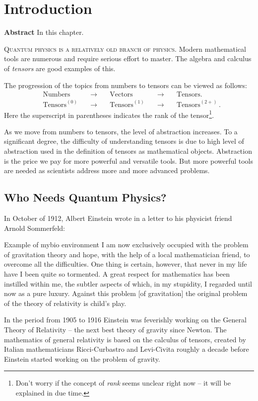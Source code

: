 \graphicspath{{../01Introduction/pics/}}

\chapter{Introduction}\label{ch:Introduction}

{\bf Abstract}\hspace{0.2cm} In this chapter.


\lettrine[lines=2]{\color{darkocre}Q}{uantum physics is a relatively old branch of physics}. Modern mathematical tools are numerous and require
serious effort to master. The algebra and calculus of \emph{tensors}
are good examples of this.

The progression of the topics from
numbers to tensors can be viewed as follows:
\begin{align*}
  & \textrm{Numbers} \quad & \rightarrow \quad & \textrm{Vectors} \quad &
  \rightarrow \quad & \textrm{Tensors.}\\
  & \textrm{Tensors}^{(0)} \quad & \rightarrow  \quad & \textrm{Tensors}^{(1)}
  \quad & \rightarrow \quad & \textrm{Tensors}^{(2+)}\,.
\end{align*}
Here the superscript in parentheses indicates the rank of the
tensor\footnote{Don't worry if the concept of \emph{rank} seems
unclear right now -- it will be explained in due time.}.

As we move from numbers to tensors, the level of abstraction
increases. To a significant degree, the difficulty of understanding
tensors is due to high level of abstraction used in the definition
of tensors as mathematical objects. Abstraction is the price we pay
for more powerful and versatile tools. But more powerful tools are
needed as scientists address more and more advanced problems.

 \section{Who Needs Quantum Physics?}

In October of 1912, Albert Einstein wrote in a letter to his physicist
friend Arnold Sommerfeld:
\begin{mybio}{Example of mybio environment}
  I am now exclusively occupied with the problem of gravitation theory
and hope, with the help of a local mathematician friend, to overcome
all the difficulties. One thing is certain, however, that never in my
life have I been quite so tormented. A great respect for mathematics
has been instilled within me, the subtler aspects of which, in my stupidity,
I regarded until now as a pure luxury. Against this problem [of
  gravitation] the original problem of the theory of relativity is
child’s play.
\end{mybio}
In the period from 1905 to 1916 Einstein was feverishly working on the
General Theory of Relativity -- the next
best theory of gravity since
Newton. The mathematics of general relativity is based on the calculus
of tensors, created by Italian mathematicians Ricci-Curbastro and
Levi-Civita roughly a decade before Einstein started working on the
problem of gravity.


